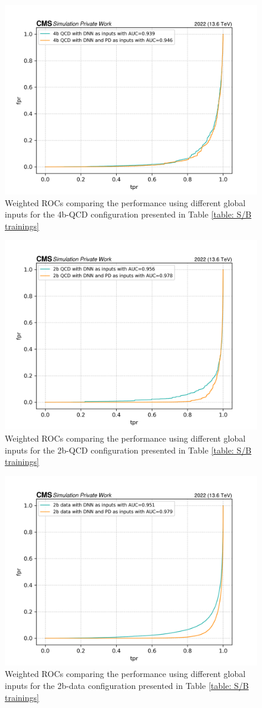 \begin{figure}[hbt]
    \centering
    \includegraphics[width=0.7\linewidth]{Images/7.S:B/Inputs/4b QCD bis.png}
    \caption{Weighted ROCs comparing the performance using different global inputs for the 4b-QCD configuration presented in Table \ref{table: S/B trainings}}
    \label{fig: 4b QCD comp input}
\end{figure}

\begin{figure}[hbt]
    \centering
    \includegraphics[width=0.7\linewidth]{Images/7.S:B/Inputs/2b QCD.png}
    \caption{Weighted ROCs comparing the performance using different global inputs for the 2b-QCD configuration presented in Table \ref{table: S/B trainings}}
    \label{fig: 2b QCD comp input}
\end{figure}

\begin{figure}[hbt]
    \centering
    \includegraphics[width=0.7\linewidth]{Images/7.S:B/Inputs/2b data.png}
    \caption{Weighted ROCs comparing the performance using different global inputs for the 2b-data configuration presented in Table \ref{table: S/B trainings}}
    \label{fig: 2b data comp input}
\end{figure}

